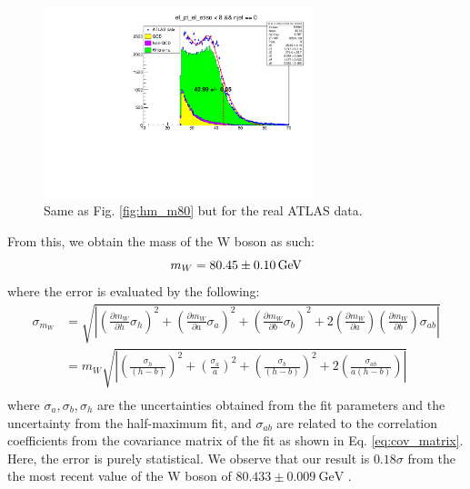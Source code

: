 \documentclass[a4paper]{report}
\numberwithin{equation}{section}
\begin{document}
\begin{figure}[htpb]
    \centering
    \includegraphics[width=0.7\textwidth]{hm_atlas.pdf}
    \caption{Same as Fig. \ref{fig:hm_m80} but for the real ATLAS data.}
    \label{fig:hm_atlas}
\end{figure}

From this, we obtain the mass of the W boson as such: 
\begin{equation}
    m_W = \SI{80.45 \pm 0.10}{\giga\electronvolt} 
\end{equation}
where the error is evaluated by the following:
\begin{align}
    \sigma_{m_W} &= \sqrt{\left| \left(\frac{\partial m_W}{\partial h} \sigma_h\right)^2 
                        + \left( \frac{\partial m_W}{\partial a} \sigma_a\right)^2 
                        + \left( \frac{\partial m_W}{\partial b} \sigma_b\right)^2
                        + 2 \left( \frac{\partial m_W}{\partial a}\right) \left( \frac{\partial m_W}{\partial b}\right) \sigma_{ab} \right|} \\
            &= m_W \sqrt{\left| \left(\frac{\sigma_h}{(h - b)}\right)^2 + \left(\frac{\sigma_a}{a}\right)^2 + 
                            \left(\frac{\sigma_b}{(h - b)}\right)^2 + 2\left(\frac{\sigma_{ab}}{a(h - b)}\right) \right|} \\
\end{align}
where $\sigma_a, \sigma_b, \sigma_h$ are the uncertainties obtained from the fit parameters and the uncertainty from the 
half-maximum fit, and $\sigma_{ab}$ are related to the correlation coefficients from the covariance matrix of the fit as shown in Eq. \ref{eq:cov_matrix}.
Here, the error is purely statistical. We observe that our result is $0.18\sigma$ from the 
 the most recent value of the W boson of $80.433 \pm 0.009 \ \text{GeV}$ \cite{CDF:2022hxs}. \par
\end{document}
